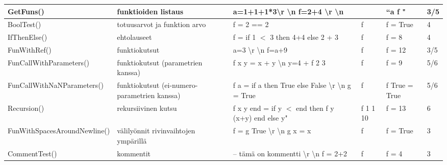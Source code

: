 \documentclass[11pt]{article} %
\begin{document}
\begin{table}[!htbp]
\begin{tabular}{|p{3cm}|p{}|p{3cm}|p{}|p{3cm}|p{}|}
 GetFuns()             & funktioiden listaus   & a=1+1+1*3\textbackslash r \textbackslash n f=2+4 \textbackslash r \textbackslash n &  &  ``a f "         &   3/5          \\ \hline
 BoolTest()    & totuusarvot ja funktion arvo  & f = 2 == 2   & f & f = True         & 4    \\ \hline
 IfThenElse()    & ehtolauseet                & f = if 1 $<$ 3 then 4+4 else 2 + 3   & f & f = 8         & 4    \\ \hline
 FunWithRef()  & funktiokutsut      &   a=3 \textbackslash r \textbackslash n f=a+9          &  f         & f = 12   & 3/5                                        \\ \hline
 FunCallWith\-Parameters()   &  funktiokutsut (parametrien kanssa)  &  f x y = x + y \textbackslash n   y=4 + f 2 3 &      f & f = 9        &  5/6             \\ \hline
 FunCallWith\-NaNPara\-meters()   &  funktiokutsut (ei-numero-parametrien kanssa)  &  f a = if a then True else False \textbackslash r \textbackslash n g = True &      f & f True = True        &  5/6             \\ \hline
 Recursion()   & rekursiivinen kutsu      &  f x y end = if y $<$ end then f y (x+y) end else y"    & f 1 1 10  & f = 13         
& 6         \\ \hline
FunWithSpaces\-AroundNewline()       & välilyönnit rivinvaihtojen ympärillä   & f = g True \textbackslash r  \textbackslash n g x = x                      & f      & f = True     &   3    \\ \hline             
CommentTest()       &  kommentit       &   -- tämä on kommentti \textbackslash r \textbackslash n f = 2+2                    &  f     & f = 4    &   3              \\ \hline             
\end{tabular}
\end{table}
\end{document}

